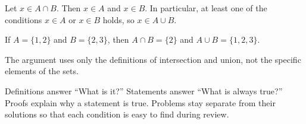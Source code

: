 \begin{solution}
  Let $x \in A \cap B$. Then $x \in A$ and $x \in B$. In particular, at
  least one of the conditions $x \in A$ or $x \in B$ holds, so
  $x \in A \cup B$.
\end{solution}

\begin{example}
  If $A=\{1,2\}$ and $B=\{2,3\}$, then
  $A\cap B=\{2\}$ and $A\cup B=\{1,2,3\}$.
\end{example}

\begin{remark}
  The argument uses only the definitions of intersection and union, not the
  specific elements of the sets.
\end{remark}

\begin{summary}
  Definitions answer ``What is it?'' Statements answer ``What is always
  true?'' Proofs explain why a statement is true. Problems stay separate from
  their solutions so that each condition is easy to find during review.
\end{summary}
